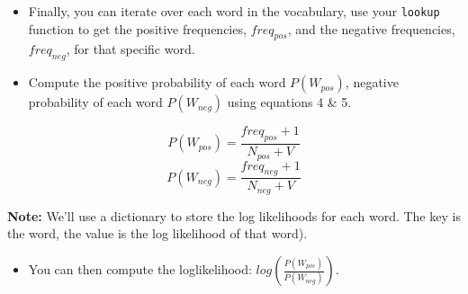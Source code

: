 \documentclass[11pt]{article}
\providecommand{\tightlist}{%
      \setlength{\itemsep}{0pt}\setlength{\parskip}{0pt}}
\begin{document}
\begin{itemize}
\tightlist
\item
  Finally, you can iterate over each word in the vocabulary, use your
  \texttt{lookup} function to get the positive frequencies,
  \(freq_{pos}\), and the negative frequencies, \(freq_{neg}\), for that
  specific word.
\item
  Compute the positive probability of each word \(P(W_{pos})\), negative
  probability of each word \(P(W_{neg})\) using equations 4 \& 5.
\end{itemize}

\[ P(W_{pos}) = \frac{freq_{pos} + 1}{N_{pos} + V}\tag{4} \]
\[ P(W_{neg}) = \frac{freq_{neg} + 1}{N_{neg} + V}\tag{5} \]

\textbf{Note:} We'll use a dictionary to store the log likelihoods for
each word. The key is the word, the value is the log likelihood of that
word).

\begin{itemize}
\tightlist
\item
  You can then compute the loglikelihood:
  \(log \left( \frac{P(W_{pos})}{P(W_{neg})} \right)\).
\end{itemize}
\end{document}
